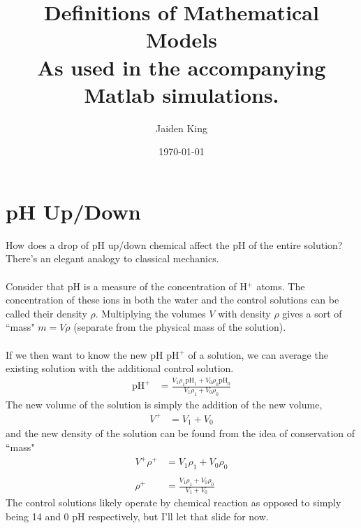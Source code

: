 \documentclass[12pt]{article}
\newcommand{\pH}{\text{pH}}
\begin{document}
\title{Definitions of Mathematical Models\\\small{As used in the accompanying Matlab simulations.}}
\date{\today}
\author{Jaiden King}
\maketitle

\section{pH Up/Down}
How does a drop of pH up/down chemical affect the pH of the entire solution? There's an elegant analogy to classical mechanics.
\\\\
Consider that pH is a measure of the concentration of H$^+$ atoms. The concentration of these ions in both the water and the control solutions can be called their density $\rho$. Multiplying the volumes $V$ with density $\rho$ gives a sort of ``mass" $m = V\rho$ (separate from the physical mass of the solution).
\\\\
If we then want to know the new pH pH$^+$ of a solution, we can average the existing solution with the additional control solution.
\begin{align*}
\pH^+ &= \frac{V_1\rho_1\pH_1 + V_0\rho_0\pH_0}{V_1\rho_1 + V_0\rho_0}
\end{align*}
The new volume of the solution is simply the addition of the new volume,
\begin{align*}
V^+ &= V_1 + V_0
\end{align*}
and the new density of the solution can be found from the idea of conservation of ``mass"
\begin{align*}
V^+\rho^+ &= V_1\rho_1 + V_0\rho_0 \\\\
\rho^+ &= \frac{V_1\rho_1 + V_0\rho_0}{V_1 + V_0}
\end{align*}
The control solutions likely operate by chemical reaction as opposed to simply being 14 and 0 pH respectively, but I'll let that slide for now.
\end{document}
